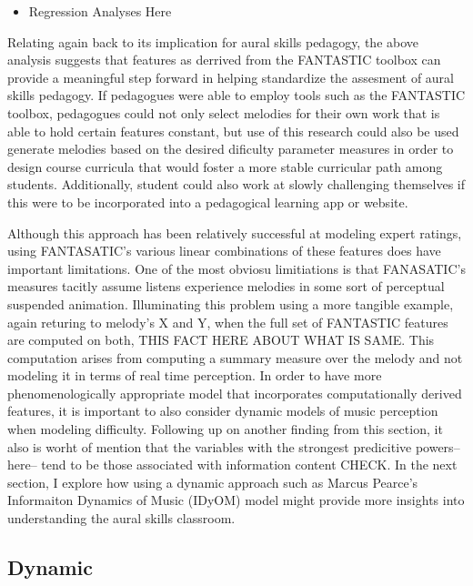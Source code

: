 \documentclass[]{book}
\providecommand{\tightlist}{%
  \setlength{\itemsep}{0pt}\setlength{\parskip}{0pt}}
\begin{document}
\begin{itemize}
\tightlist
\item
  Regression Analyses Here
\end{itemize}

Relating again back to its implication for aural skills pedagogy, the above analysis suggests that features as derrived from the FANTASTIC toolbox can provide a meaningful step forward in helping standardize the assesment of aural skills pedagogy.
If pedagogues were able to employ tools such as the FANTASTIC toolbox, pedagogues could not only select melodies for their own work that is able to hold certain features constant, but use of this research could also be used generate melodies based on the desired dificulty parameter measures in order to design course curricula that would foster a more stable curricular path among students.
Additionally, student could also work at slowly challenging themselves if this were to be incorporated into a pedagogical learning app or website.

Although this approach has been relatively successful at modeling expert ratings, using FANTASATIC's various linear combinations of these features does have important limitations.
One of the most obviosu limitiations is that FANASATIC's measures tacitly assume listens experience melodies in some sort of perceptual suspended animation.
Illuminating this problem using a more tangible example, again returing to melody's X and Y, when the full set of FANTASTIC features are computed on both, THIS FACT HERE ABOUT WHAT IS SAME.
This computation arises from computing a summary measure over the melody and not modeling it in terms of real time perception.
In order to have more phenomenologically appropriate model that incorporates computationally derived features, it is important to also consider dynamic models of music perception when modeling difficulty.
Following up on another finding from this section, it also is worht of mention that the variables with the strongest predicitive powers-- here-- tend to be those associated with information content CHECK.
In the next section, I explore how using a dynamic approach such as Marcus Pearce's Informaiton Dynamics of Music (IDyOM) model \citep{pearceConstructionEvaluationStatistical2005, pearceStatisticalLearningProbabilistic2018a} might provide more insights into understanding the aural skills classroom.

\hypertarget{dynamic-1}{%
\subsection{Dynamic}\label{dynamic-1}}
\end{document}
